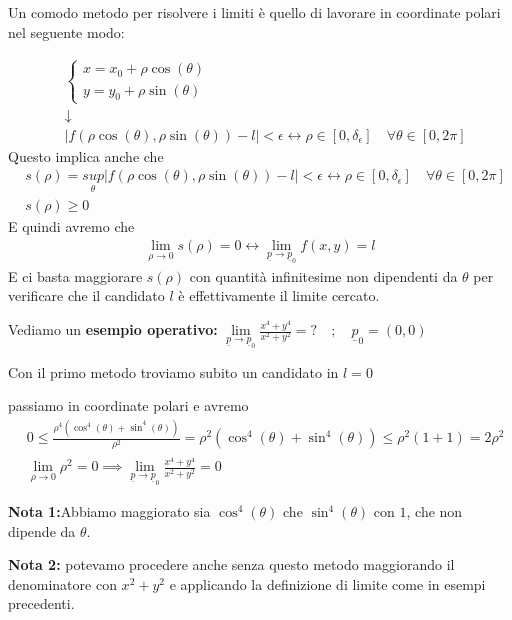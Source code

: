 Un comodo metodo per risolvere i limiti è quello di lavorare in coordinate polari nel seguente modo:

\begin{align}
&\left\{
\begin{array}{cc}
x=x_0 + \rho \cos(\theta)\\
y=y_0 + \rho \sin(\theta)
\end{array}
\right. \\
&\downarrow \nonumber \\
&|f(\rho \cos(\theta),\rho \sin(\theta)) - l|<\epsilon \leftrightarrow \rho \in [0,\delta_\epsilon] \quad \forall \theta \in [0,2\pi]
\end{align}
Questo implica anche che
\begin{align}
{}&s(\rho)= \underset{\theta}{sup}|f(\rho \cos(\theta),\rho \sin(\theta)) - l|<\epsilon \leftrightarrow \rho \in [0,\delta_\epsilon] \quad \forall \theta \in [0,2\pi]\\
&s(\rho)\geq 0
\end{align}
E quindi avremo che 
\begin{align}
\underset{\rho \rightarrow 0}{\lim}s(\rho)=0 \leftrightarrow \underset{\underline{p}\rightarrow \underline{p}_0}{\lim}f(x,y)=l
\end{align}
E ci basta maggiorare $s(\rho)$ con quantità infinitesime non dipendenti da $\theta$ per verificare che il candidato $l$ è effettivamente il limite cercato.

\bigskip

Vediamo un \textbf{esempio operativo:} $\underset{\underline{p}\rightarrow \underline{p}_0}{\lim}\frac{x^4 + y^4}{x^2 + y^2}=? \quad ; \quad \underline{p}_0=(0,0)$

Con il primo metodo troviamo subito un candidato in $l=0$

passiamo in coordinate polari e avremo
\begin{align}
{}&0\leq \frac{\rho^4(\cos^4(\theta) + \sin^4(\theta)) }{\rho^2}= \rho^2(\cos^4(\theta) + \sin^4(\theta)) \leq \rho^2 (1+1)=2\rho^2\\
&\underset{\rho \rightarrow 0}{\lim}\rho^2=0 \implies \underset{\underline{p}\rightarrow \underline{p}_0}{\lim}\frac{x^4 + y^4}{x^2 + y^2}=0
\end{align}

\textbf{Nota 1:}Abbiamo maggiorato sia $\cos^4(\theta)$ che $\sin^4(\theta)$ con $1$, che non dipende da $\theta$.

\textbf{Nota 2:} potevamo procedere anche senza questo metodo maggiorando il denominatore con $x^2 + y^2$ e applicando la definizione di limite come in esempi precedenti.

